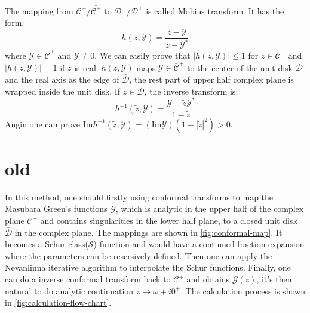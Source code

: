\documentclass[
	preprint,%
	aps,
	prb,
	showpacs,	
	amsmath, amssymb]{revtex4-2}
\DeclareRobustCommand{\+}{\hstretch{1.25} {\boldsymbol {\mathrel{+}}}}
\newcommand{\im}{ {\mathrm{Im}} }
\newcommand{\Y}{ {\mathcal{Y}} }
\newcommand{\C}{ {\mathcal{C}} }
\newcommand{\Cbar}{ {\bar{\mathcal{C}}} }
\newcommand{\D}{ {\mathcal{D}} }
\newcommand{\Dbar}{ {\bar{\mathcal{D}}} }
\begin{document}
The mapping from $\C^+/\bar{\C^+}$ to 
$\D^+/\bar{\D^+}$ is called Mobius transform.
It has the form:
\begin{equation}\label{eq:def-mobius-transform}
	h(z, \Y)  = \frac{z - \Y}{z - \Y^*}
\end{equation}
where $\Y \in \Cbar^+$ and $\Y \neq 0$. We can easily prove that 
$|h(z, \Y)| \leq 1$ for $z \in \Cbar^+$ and
$|h(z, \Y)| = 1$ if $z$ is real. $h(z, \Y)$ maps $\Y \in \Cbar^+$
to the center of the unit disk $\D$ and the real axis as the 
edge of $\Dbar$, the rest part of upper half complex plane is 
wrapped inside the unit disk. If $ \tilde{z} \in \D$, the inverse 
transform is:
\begin{equation}\label{eq:def-inv-mobius-transform}
	h^{-1}(\tilde{z}, \Y) = \frac{\Y - \tilde{z}\Y^*}{1 - \tilde{z}}
\end{equation}
Angin one can prove 
$\im h^{-1}(\tilde{z}, \Y) = (\im\Y)(1 - |\tilde{z}|^2 ) > 0$.







\section{old}



In this method, one should firstly using 
conformal transforms to map the Masubara Green's functions $\mathcal{G}$, 
which is analytic in the upper half of the complex plane $\C^+$ and 
contains singularities in the lower half plane, to a closed unit disk 
$\Dbar$ in the complex plane. The mappings are shown in \cref{fig:conformal-map}. 
It becomes a Schur class($\mathcal{S}$) 
function and would have a continued fraction expansion where the parameters 
can be rescrsively defined\cite{schur1918potenzreihen}. Then one can 
apply the Nevanlinna iterative algorithm to interpolate the Schur 
functions\cite{nevanlinna1919uber}.
Finally, one can do a inverse conformal transform back to $\C^+$ and 
obtains $\mathcal{G}(z)$, it's then natural to do analytic continuation 
$z \to \omega + i0^+$. The calculation process is shown in \cref{fig:calculation-flow-chart}.
\end{document}
